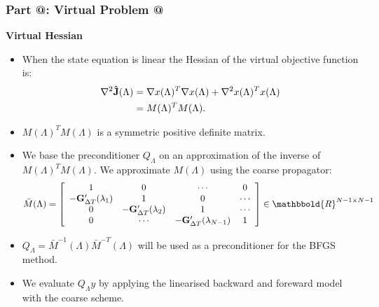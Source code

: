 \documentclass[9pt]{beamer}
\makeatletter
\newcommand*{\rom}[1]{\expandafter\@slowromancap\romannumeral #1@}
\makeatother
\begin{document}
\begin{frame}
\frametitle{\textbf{ Part \rom{3}:} Virtual Problem \rom{2}}
\textbf{Virtual Hessian}
\begin{itemize}
\item{When the state equation is linear the Hessian of the virtual objective function is:
{\small 
\begin{align*}
\nabla^2 \bold{\hat J}(\Lambda)&= \nabla x(\Lambda)^T \nabla x(\Lambda) + \nabla^2 x(\Lambda)^Tx(\Lambda) \\
&= M(\Lambda)^TM(\Lambda).
\end{align*}}}
\item<2->{$M(\Lambda)^TM(\Lambda)$ is a symmetric positive definite matrix.}
\end{itemize}
\begin{itemize}
\item<3->{We base the preconditioner $Q_{\Lambda}$ on an approximation of the inverse of {$M(\Lambda)^TM(\Lambda)$}. We approximate $M(\Lambda)$ using the coarse propagator:
\begin{align*}
\bar M(\Lambda)= \left[ \begin{array}{cccc}
   1 & 0 & \cdots & 0 \\  
   -\bold{G}_{\Delta T}'(\lambda_{1}) & 1 & 0 & \cdots \\ 
   0 &-\bold{G}_{\Delta T}'(\lambda_{2}) & 1  & \cdots \\
   0 &\cdots &-\bold{G}_{\Delta T}'(\lambda_{N-1}) & 1  \\
   \end{array}  \right]\in\mathbbold{R}^{N-1\times N-1}
\end{align*}}
\item<4->{$Q_{\Lambda}=\bar{M}^{-1}(\Lambda)\bar{M}^{-T}(\Lambda)$ will be used as a preconditioner for the BFGS method.}
\item<5->{We evaluate $Q_{\Lambda}y$ by applying the linearised backward and foreward model with the coarse scheme. }
\end{itemize}
\end{frame}
\end{document}
